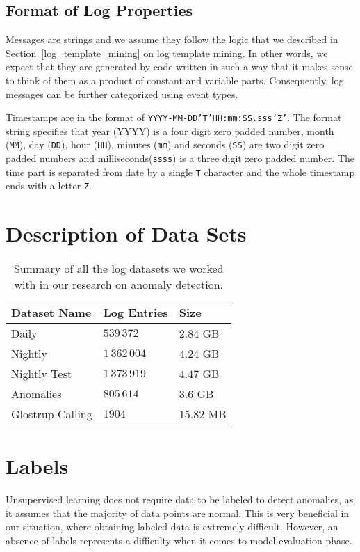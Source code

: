 \subsection{Format of Log Properties}
Messages are strings and we assume they follow the logic that we described in Section~\ref{log_template_mining} on log template mining. In other words, we expect that they are generated by code written in such a way that it makes sense to think of them as a product of constant and variable parts. Consequently, log messages can be further categorized using event types.

Timestamps are in the format of \texttt{YYYY-MM-DD'T'HH:mm:SS.sss'Z'}. The format string specifies that year (YYYY) is a four digit zero padded number, month (\texttt{MM}), day (\texttt{DD}), hour (\texttt{HH}), minutes (\texttt{mm}) and seconds (\texttt{SS}) are two digit zero padded numbers and milliseconds(\texttt{ssss}) is a three digit zero padded number. The time part is separated from date by a single \texttt{T} character and the whole timestamp ends with a letter \texttt{Z}.

\section{Description of Data Sets}
\begin{table}[!h]
\centering
\begin{tabular}{@{}lll@{}}
\toprule
\textbf{Dataset Name} & \textbf{Log Entries}       & \textbf{Size}           \\ \toprule
Daily           & $539\,372$             & $2.84$ GB    \\
Nightly         & $1\,362\,004$ & $4.24$ GB \\
Nightly Test       & $1\,373\,919$             & $4.47$ GB \\
Anomalies           & $805\,614$             & $3.6$ GB \\
Glostrup Calling    & $1904$             & $15.82$ MB
\end{tabular}
\caption{Summary of all the log datasets we worked with in our research on anomaly detection.}
\label{table:datasets}
\end{table}

\section{Labels} 
Unsupervised learning does not require data to be labeled to detect anomalies, as it assumes that the majority of data points are normal. This is very beneficial in our situation, where obtaining labeled data is extremely difficult. However, an absence of labels represents a difficulty when it comes to model evaluation phase.

